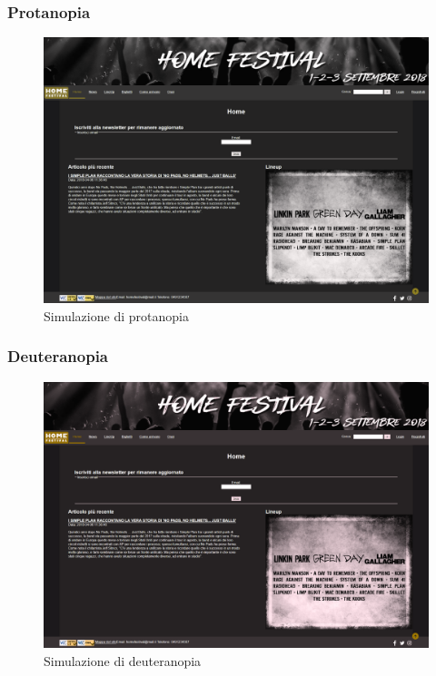 \documentclass[10pt, a4paper]{article}
\begin{document}
\subsubsection{Protanopia}

\begin{figure}[h!]
 \centering
  \includegraphics[width=1\textwidth]{Images/protanopia.png}
  \caption{Simulazione di protanopia}
  \label{fig:protanopia}
\end{figure}
\newpage
\subsubsection{Deuteranopia}

\begin{figure}[h!]
 \centering
  \includegraphics[width=1\textwidth]{Images/deuteranopia.png}
  \caption{Simulazione di deuteranopia}
  \label{fig:deuteranopia}
\end{figure}
\newpage
\end{document}
